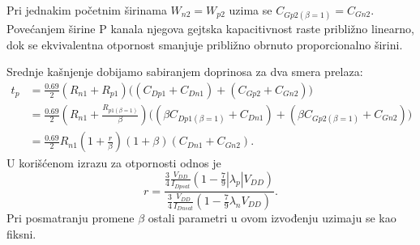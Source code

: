 Pri jednakim početnim širinama $W_{n2}=W_{p2}$ uzima se $C_{Gp2(\beta=1)}=C_{Gn2}$. Povećanjem širine P kanala njegova gejtska kapacitivnost raste približno linearno, dok se ekvivalentna otpornost smanjuje približno obrnuto proporcionalno širini.

Srednje kašnjenje dobijamo sabiranjem doprinosa za dva smera prelaza:
\[\begin{aligned}
t_p&=\frac{0.69}2(R_{n1}+R_{p1})\bigl((C_{Dp1}+C_{Dn1})+(C_{Gp2}+C_{Gn2})\bigr)\\
&=\frac{0.69}2\left(R_{n1}+\frac{R_{p1(\beta=1)}}\beta\right)
\bigl((\beta C_{Dp1(\beta=1)}+C_{Dn1})+(\beta C_{Gp2(\beta=1)}+C_{Gn2})\bigr)\\
&=\frac{0.69}2R_{n1}\left(1+\frac r\beta\right)(1+\beta)(C_{Dn1}+C_{Gn2}).
\end{aligned}\]
U korišćenom izrazu za otpornosti odnos je
\[r=\frac{\frac34\frac{V_{DD}}{I_{Dpsat}}(1-\frac79|\lambda_p|V_{DD})}
{\frac34\frac{V_{DD}}{I_{Dnsat}}(1-\frac79\lambda_nV_{DD})}.
\]
Pri posmatranju promene $\beta$ ostali parametri u ovom izvođenju uzimaju se kao fiksni.
